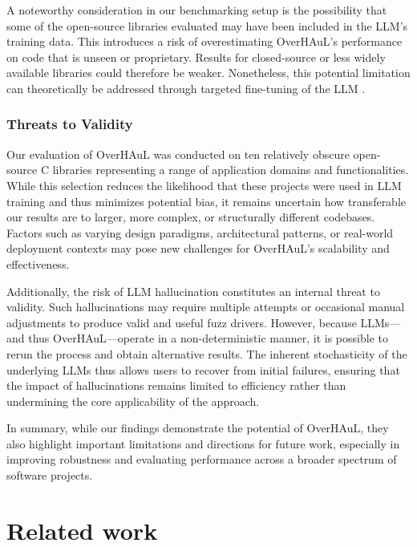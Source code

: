\documentclass[
  a4paper,
]{scrreprt}
\theoremstyle{definition}
\theoremstyle{remark}
\begin{document}
A noteworthy consideration in our benchmarking setup is the possibility
that some of the open-source libraries evaluated may have been included
in the LLM's training data. This introduces a risk of overestimating
OverHAuL's performance on code that is unseen or proprietary. Results
for closed-source or less widely available libraries could therefore be
weaker. Nonetheless, this potential limitation can theoretically be
addressed through targeted fine-tuning of the LLM
\autocite{openaidocs2025b,kim2025}.

\subsection{Threats to Validity}\label{threats-to-validity}

Our evaluation of OverHAuL was conducted on ten relatively obscure
open-source C libraries representing a range of application domains and
functionalities. While this selection reduces the likelihood that these
projects were used in LLM training and thus minimizes potential bias, it
remains uncertain how transferable our results are to larger, more
complex, or structurally different codebases. Factors such as varying
design paradigms, architectural patterns, or real-world deployment
contexts may pose new challenges for OverHAuL's scalability and
effectiveness.

Additionally, the risk of LLM hallucination constitutes an internal
threat to validity. Such hallucinations may require multiple attempts or
occasional manual adjustments to produce valid and useful fuzz drivers.
However, because LLMs---and thus OverHAuL---operate in a
non-deterministic manner, it is possible to rerun the process and obtain
alternative results. The inherent stochasticity of the underlying LLMs
thus allows users to recover from initial failures, ensuring that the
impact of hallucinations remains limited to efficiency rather than
undermining the core applicability of the approach.

In summary, while our findings demonstrate the potential of OverHAuL,
they also highlight important limitations and directions for future
work, especially in improving robustness and evaluating performance
across a broader spectrum of software projects.


\chapter{Related work}\label{sec-related}
\end{document}
